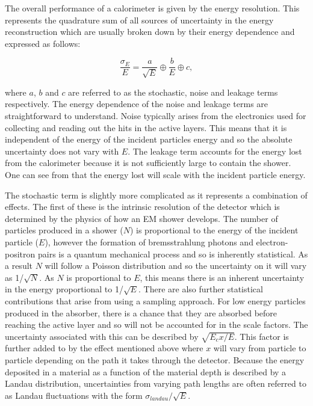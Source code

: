 The overall performance of a calorimeter is given by the energy resolution. This represents the quadrature sum of all sources of uncertainty in the energy reconstruction which are usually broken down by their energy dependence and expressed as follows:

\begin{equation}
  \frac{\sigma_E}{E}=\frac{a}{\sqrt{E}} \oplus \frac{b}{E} \oplus c,
\end{equation}

where $a$, $b$ and $c$ are referred to as the stochastic, noise and leakage terms respectively. The energy dependence of the noise and leakage terms are straightforward to understand. Noise typically arises from the electronics used for collecting and reading out the hits in the active layers. This means that it is independent of the energy of the incident particles energy and so the absolute uncertainty does not vary with $E$. The leakage term accounts for the energy lost from the calorimeter because it is not sufficiently large to contain the shower. One can see from  that the energy lost will scale with the incident particle energy.

The stochastic term is slightly more complicated as it represents a combination of effects. The first of these is the intrinsic resolution of the detector which is determined by the physics of how an \ac{EM} shower develops. The number of particles produced in a shower ($N$)  is proportional to the energy of the incident particle ($E$), however the formation of bremsstrahlung photons and electron-positron pairs is a quantum mechanical process and so is inherently statistical. As a result $N$ will follow a Poisson distribution and so the uncertainty on it will vary as 1/$\sqrt{N}$. As $N$ is proportional to $E$, this means there is an inherent uncertainty in the energy proportional to 1/$\sqrt{E}$. There are also further statistical contributions that arise from using a sampling approach. For low energy particles produced in the absorber, there is a chance that they are absorbed before reaching the active layer and so will not be accounted for in the scale factors. The uncertainty associated with this can be described by $\sqrt{E_{c}x/E}$. This factor is further added to by the effect mentioned above where $x$ will vary from particle to particle depending on the path it takes through the detector. Because the energy deposited in a material as a function of the material depth is described by a Landau distribution, uncertainties from varying path lengths are often referred to as Landau fluctuations with the form $\sigma_{landau}/\sqrt{E}$.

